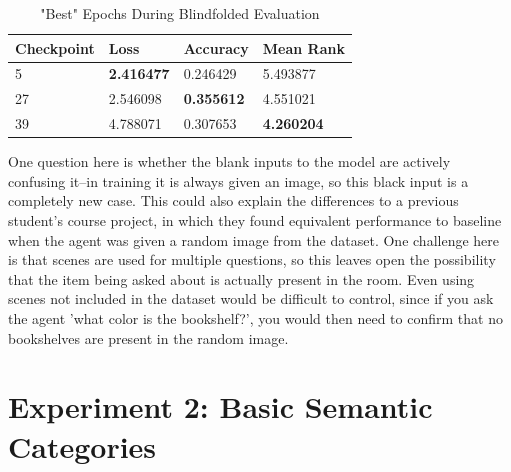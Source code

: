 \begin{table}[H]
\centering
\caption{"Best" Epochs During Blindfolded Evaluation}
\begin{tabular}{l | l | l | l}
Checkpoint & Loss & Accuracy & Mean Rank \\
\hline
5 & \textbf{2.416477} & 0.246429 & 5.493877 \\
27 & 2.546098 & \textbf{0.355612} & 4.551021 \\
39 & 4.788071 & 0.307653 & \textbf{4.260204}
\end{tabular}
\label{tab:best_blindfolded}
\end{table}

One question here is whether the blank inputs to the model are actively confusing it--in training it is always given an image, so this black input is a completely new case. This could also explain the differences to a previous student's course project, in which they found equivalent performance to baseline when the agent was given a random image from the dataset. One challenge here is that scenes are used for multiple questions, %
so this leaves open the possibility that the item being asked about is actually present in the room. Even using scenes not included in the dataset would be difficult to control, since if you ask the agent 'what color is the bookshelf?', you would then need to confirm that no bookshelves are present in the random image. \newline


\section{Experiment 2: Basic Semantic Categories}
\label{sec:exp_2}
